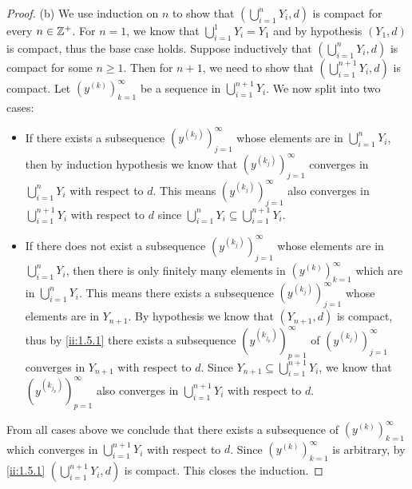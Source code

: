 \begin{proof}{(b)}
  We use induction on \(n\) to show that \((\bigcup_{i = 1}^n Y_i, d)\) is compact for every \(n \in \mathbb{Z}^+\).
  For \(n = 1\), we know that \(\bigcup_{i = 1}^1 Y_i = Y_1\) and by hypothesis \((Y_1, d)\) is compact, thus the base case holds.
  Suppose inductively that \((\bigcup_{i = 1}^n Y_i, d)\) is compact for some \(n \geq 1\).
  Then for \(n + 1\), we need to show that \((\bigcup_{i = 1}^{n + 1} Y_i, d)\) is compact.
  Let \((y^{(k)})_{k = 1}^\infty\) be a sequence in \(\bigcup_{i = 1}^{n + 1} Y_i\).
  We now split into two cases:
  \begin{itemize}
    \item If there exists a subsequence \((y^{(k_j)})_{j = 1}^\infty\) whose elements are in \(\bigcup_{i = 1}^n Y_i\), then by induction hypothesis we know that \((y^{(k_j)})_{j = 1}^\infty\) converges in \(\bigcup_{i = 1}^n Y_i\) with respect to \(d\).
          This means \((y^{(k_j)})_{j = 1}^\infty\) also converges in \(\bigcup_{i = 1}^{n + 1} Y_i\) with respect to \(d\) since \(\bigcup_{i = 1}^n Y_i \subseteq \bigcup_{i = 1}^{n + 1} Y_i\).
    \item If there does not exist a subsequence \((y^{(k_j)})_{j = 1}^\infty\) whose elements are in \(\bigcup_{i = 1}^n Y_i\), then there is only finitely many elements in \((y^{(k)})_{k = 1}^\infty\) which are in \(\bigcup_{i = 1}^n Y_i\).
          This means there exists a subsequence \((y^{(k_j)})_{j = 1}^\infty\) whose elements are in \(Y_{n + 1}\).
          By hypothesis we know that \((Y_{n + 1}, d)\) is compact, thus by \cref{ii:1.5.1} there exists a subsequence \((y^{(k_{j_p})})_{p = 1}^\infty\) of \((y^{(k_j)})_{j = 1}^\infty\) converges in \(Y_{n + 1}\) with respect to \(d\).
          Since \(Y_{n + 1} \subseteq \bigcup_{i = 1}^{n + 1} Y_i\), we know that \((y^{(k_{j_p})})_{p = 1}^\infty\) also converges in \(\bigcup_{i = 1}^{n + 1} Y_i\) with respect to \(d\).
  \end{itemize}
  From all cases above we conclude that there exists a subsequence of \((y^{(k)})_{k = 1}^\infty\) which converges in \(\bigcup_{i = 1}^{n + 1} Y_i\) with respect to \(d\).
  Since \((y^{(k)})_{k = 1}^\infty\) is arbitrary, by \cref{ii:1.5.1} \((\bigcup_{i = 1}^{n + 1} Y_i, d)\) is compact.
  This closes the induction.
\end{proof}

